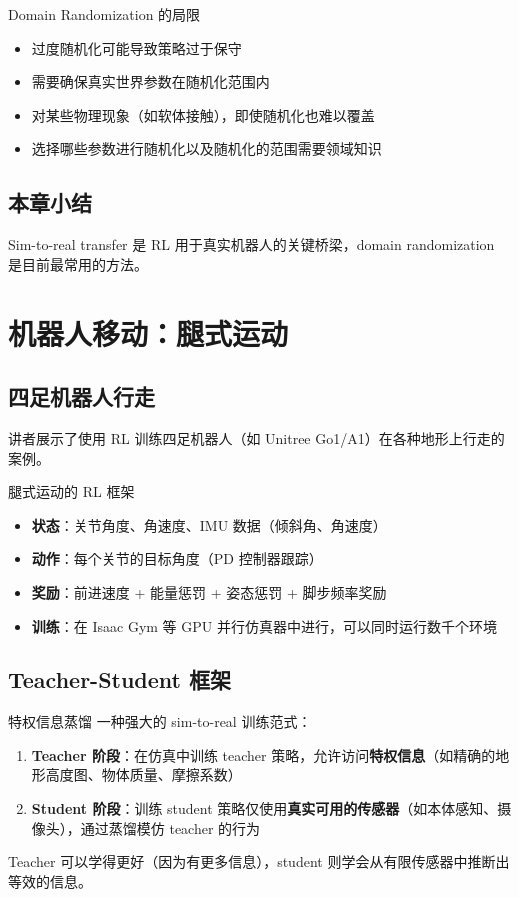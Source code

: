 \documentclass[a4paper]{article}
\begin{document}
\begin{warningbox}{Domain Randomization 的局限}
\begin{itemize}
    \item 过度随机化可能导致策略过于保守
    \item 需要确保真实世界参数在随机化范围内
    \item 对某些物理现象（如软体接触），即使随机化也难以覆盖
    \item 选择哪些参数进行随机化以及随机化的范围需要领域知识
\end{itemize}
\end{warningbox}

\subsection{本章小结}

Sim-to-real transfer 是 RL 用于真实机器人的关键桥梁，domain randomization 是目前最常用的方法。

\section{机器人移动：腿式运动}

\subsection{四足机器人行走}

讲者展示了使用 RL 训练四足机器人（如 Unitree Go1/A1）在各种地形上行走的案例。

\begin{importantbox}{腿式运动的 RL 框架}
\begin{itemize}
    \item \textbf{状态}：关节角度、角速度、IMU 数据（倾斜角、角速度）
    \item \textbf{动作}：每个关节的目标角度（PD 控制器跟踪）
    \item \textbf{奖励}：前进速度 + 能量惩罚 + 姿态惩罚 + 脚步频率奖励
    \item \textbf{训练}：在 Isaac Gym 等 GPU 并行仿真器中进行，可以同时运行数千个环境
\end{itemize}
\end{importantbox}

\subsection{Teacher-Student 框架}

\begin{knowledgebox}{特权信息蒸馏}
一种强大的 sim-to-real 训练范式：
\begin{enumerate}
    \item \textbf{Teacher 阶段}：在仿真中训练 teacher 策略，允许访问\textbf{特权信息}（如精确的地形高度图、物体质量、摩擦系数）
    \item \textbf{Student 阶段}：训练 student 策略仅使用\textbf{真实可用的传感器}（如本体感知、摄像头），通过蒸馏模仿 teacher 的行为
\end{enumerate}
Teacher 可以学得更好（因为有更多信息），student 则学会从有限传感器中推断出等效的信息。
\end{knowledgebox}
\end{document}
